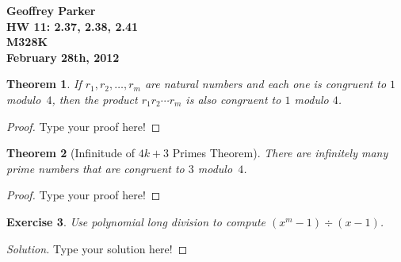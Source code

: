 \documentclass[12pt,leqno]{article}
\numberwithin{equation}{section}
\newtheorem{thm}{Theorem}[section]
\newtheorem{exer}[thm]{Exercise}
\theoremstyle{definition}
\begin{document}
\thispagestyle{plain}
\begin{flushright}
\large{\textbf{Geoffrey Parker \\
HW 11: 2.37, 2.38, 2.41\\
M328K \\
February 28th, 2012 \\}}
\end{flushright}

\markboth{}{} \setcounter{section}{0} \baselineskip=18pt

\setcounter{tocdepth}{4}



\setcounter{section}{2}

\setcounter{thm}{36}


\begin{thm}
If $r_1, r_2, \hdots, r_m$ are natural numbers and each one is
congruent to $1$ modulo~$4$, then the product $r_1r_2 \cdots r_m$ is
also congruent to $1$ modulo $4$.
\end{thm}

\begin{proof}[Proof]
Type your proof here!
\end{proof}



\begin{thm}[Infinitude of $4k + 3$ Primes Theorem]
There are infinitely many prime numbers that are congruent to $3$
modulo~$4$.
\end{thm}

\begin{proof}[Proof]
Type your proof here!
\end{proof}


\setcounter{thm}{40}


\begin{exer}
Use  polynomial long division to compute $(x^m-1) \div (x-1)$.
\end{exer}

\begin{proof}[Solution]
Type your solution here!
\end{proof}
\end{document}
